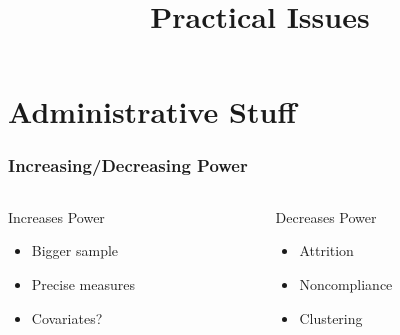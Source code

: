 \documentclass[14pt]{beamer} %
\title{Practical Issues}
\date[]{}
\begin{document}
\frame{\titlepage}

\frame{\tableofcontents}

\section[]{Administrative Stuff}
\frame{\tableofcontents[currentsection]}



\begin{frame}

\frametitle{Increasing/Decreasing Power}

\begin{columns}
\begin{column}{0.5\textwidth}
\begin{block}{Increases Power}
\begin{itemize}\itemsep1em
\item Bigger sample
\item Precise measures
\item Covariates?
\end{itemize}
\end{block}
\end{column}

\begin{column}{0.5\textwidth}
\begin{block}{Decreases Power}
\begin{itemize}\itemsep1em
\item Attrition
\item Noncompliance
\item Clustering
\end{itemize}
\end{block}
\end{column}
\end{columns}

\end{frame}
\end{document}
